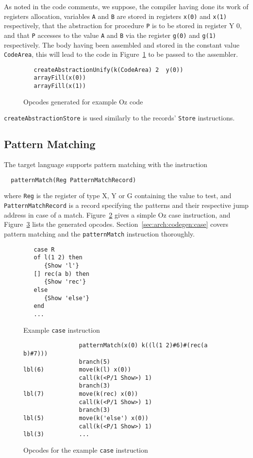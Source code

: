 \documentclass[a4paper]{memoir}
\begin{document}
As noted in the code comments, we suppose, the compiler having done its work of
registers allocation, variables \lstinline!A! and \lstinline!B! are stored in
registers \lstinline!x(0)! and \lstinline!x(1)!
respectively, that the abstraction for procedure \lstinline!P! is to be stored in register Y
0, and that \lstinline!P! accesses to the value \lstinline!A! and \lstinline!B!
via the register \lstinline!g(0)! and \lstinline!g(1)!
respectively.
The body having been assembled and stored in the constant value
\lstinline!CodeArea!, this
will lead to the code in Figure~\ref{fig:opcodes:procedures:result} to be passed
to the assembler.
\begin{figure}[ht]
\begin{lstlisting}
   createAbstractionUnify(k(CodeArea) 2  y(0))
   arrayFill(x(0))
   arrayFill(x(1))
\end{lstlisting}
\caption{Opcodes generated for example Oz code}
\label{fig:opcodes:procedures:result}
\end{figure}

\lstinline!createAbstractionStore! is used similarly to the records'
\lstinline!Store! instructions.

\subsection{Pattern Matching}
The target language supports pattern matching with the instruction
\begin{lstlisting}
  patternMatch(Reg PatternMatchRecord)
\end{lstlisting}
where \lstinline!Reg! is the register of type X, Y or G containing the value to test, and
\lstinline!PatternMatchRecord! is a record specifying the patterns and their
respective jump address in case of a match.
Figure~\ref{fig:target:ozcase} gives a simple Oz case instruction, and Figure~\ref{fig:target:case} lists the generated opcodes.
Section~\ref{sec:arch:codegen:case} covers pattern matching and the \lstinline!patternMatch! instruction thoroughly.
 
\begin{figure}[ht]
\begin{lstlisting}
   case R
   of l(1 2) then
      {Show 'l'}
   [] rec(a b) then
      {Show 'rec'}
   else
      {Show 'else'}
   end
   ...
\end{lstlisting}
\caption{Example \lstinline!case! instruction}
\label{fig:target:ozcase}
\end{figure}

\begin{figure}[ht]
\begin{lstlisting}
                patternMatch(x(0) k((l(1 2)#6)#(rec(a b)#7)))
                branch(5)
lbl(6)          move(k(l) x(0))
                call(k(<P/1 Show>) 1)
                branch(3)
lbl(7)          move(k(rec) x(0))
                call(k(<P/1 Show>) 1)
                branch(3)
lbl(5)          move(k('else') x(0))
                call(k(<P/1 Show>) 1)
lbl(3)          ...
\end{lstlisting}
\caption{Opcodes for the example \lstinline!case! instruction}
\label{fig:target:case}
\end{figure}
\end{document}

